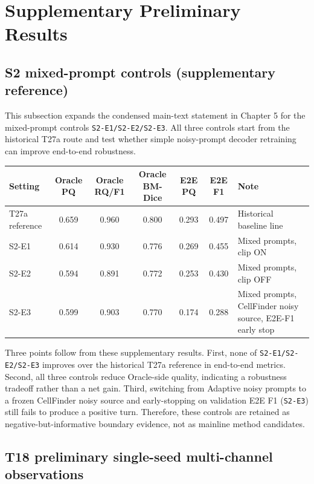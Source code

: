 \section{Supplementary Preliminary Results}\label{supplementary-preliminary-results}

\subsection{S2 mixed-prompt controls (supplementary reference)}\label{s2-mixed-prompt-controls-supplementary-reference}

This subsection expands the condensed main-text statement in Chapter 5 for the mixed-prompt controls \texttt{S2-E1/S2-E2/S2-E3}. All three controls start from the historical T27a route and test whether simple noisy-prompt decoder retraining can improve end-to-end robustness.

{%
\begin{longtable}[]{@{}lcccccl@{}}
\toprule\noalign{}
Setting & Oracle PQ & Oracle RQ/F1 & Oracle BM-Dice & E2E PQ & E2E F1 & Note \\
\midrule\noalign{}
\endhead
\bottomrule\noalign{}
\endlastfoot
T27a reference & 0.659 & 0.960 & 0.800 & 0.293 & 0.497 & Historical baseline line \\
S2-E1 & 0.614 & 0.930 & 0.776 & 0.269 & 0.455 & Mixed prompts, clip ON \\
S2-E2 & 0.594 & 0.891 & 0.772 & 0.253 & 0.430 & Mixed prompts, clip OFF \\
S2-E3 & 0.599 & 0.903 & 0.770 & 0.174 & 0.288 & Mixed prompts, CellFinder noisy source, E2E-F1 early stop \\
\end{longtable}
}

Three points follow from these supplementary results. First, none of \texttt{S2-E1/S2-E2/S2-E3} improves over the historical T27a reference in end-to-end metrics. Second, all three controls reduce Oracle-side quality, indicating a robustness tradeoff rather than a net gain. Third, switching from Adaptive noisy prompts to a frozen CellFinder noisy source and early-stopping on validation E2E F1 (\texttt{S2-E3}) still fails to produce a positive turn. Therefore, these controls are retained as negative-but-informative boundary evidence, not as mainline method candidates.

\subsection{T18 preliminary single-seed multi-channel observations}\label{t18-preliminary-single-seed-multi-channel-observations}

